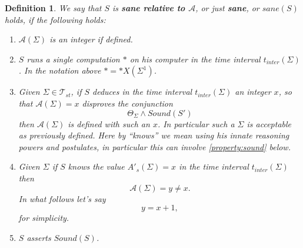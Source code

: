 \documentclass[9pt,twocolumn,twoside,lineno]{pnas-new}
\numberwithin{equation}{section}
\newtheorem{definition}[equation]{Definition}
\theoremstyle{definition}
\theoremstyle{remark}
\begin{document}
\begin{definition} \label{def:sane}  We say that $S$ is \textbf{\emph{sane relative to $\mathcal{A}$}}, or just \textbf{\emph{sane}}, or $sane (S)$ holds, if the following holds: 
\begin{enumerate}
   \item $\mathcal{A} (\Sigma)$ is an integer if defined.
   \item $S$ runs a single computation $*$ on his computer in the time interval $t _{inter} (\Sigma) $. In the notation above $*=* X (\Sigma ^{1} ) $.
\item \label{property:halting} Given $\Sigma \in \mathcal{T} _{st} $, if $S$ deduces in the time interval $t _{inter} (\Sigma) $ an integer $x$, so that $\mathcal{A} (\Sigma) = x$  disproves the conjunction
\begin{equation} \label{eq:disprove}
 \Theta _{\Sigma} \land Sound (S') 
\end{equation}
     then $\mathcal{A}  (\Sigma)$ is defined with such an $x$.  In particular such a $\Sigma$ is acceptable as previously defined.  Here by ``knows'' we mean using his innate reasoning powers and postulates,  in particular this can involve \ref{property:sound} below.
\item \label{property:genuine} Given $\Sigma$ if $S$ knows the value $A' _{s}  (\Sigma)=  x $ in the time interval $t _{inter} (\Sigma) $ then $$\mathcal{A}  (\Sigma)= y \neq x.$$ 
In what follows let's say $$y=x+1,$$ for simplicity. 
\item \label{property:sound} $S$ asserts $Sound (S)$. 
\end {enumerate}
\end{definition}
\end{document}

